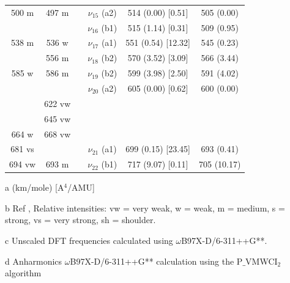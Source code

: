 \begin{table}[H]
\begin{center}
\begin{threeparttable}
\begin{tabular}{c c c c c c}
500 m & 497 m &  & $\nu_{15}$ (a2) & 514 (0.00) [0.51] & 505 (0.00) \\ 
&  &  & $\nu_{16}$ (b1) & 515 (1.14) [0.31] & 509 (0.95) \\ 
538 m & 536 w &  & $\nu_{17}$ (a1) & 551 (0.54) [12.32] & 545 (0.23) \\ 
& 556 m &  & $\nu_{18}$ (b2) & 570 (3.52) [3.09] & 566 (3.44) \\ 
585 w & 586 m &  & $\nu_{19}$ (b2) & 599 (3.98) [2.50] & 591 (4.02) \\ 
&  &  & $\nu_{20}$ (a2) & 605 (0.00) [0.62] & 600 (0.00) \\ 
& 622 vw &  &  &  & \multicolumn{1}{l}{} \\ 
& 645 vw &  &  &  &  \\ 
664 w & 668 vw &  &  & \multicolumn{1}{c}{} &  \\ 
681 vs &  &  & \multicolumn{1}{c}{$\nu_{21}$ (a1)} & 699 (0.15) [23.45] & 693 (0.41) \\ 
694 vw & 693 m &  & \multicolumn{1}{c}{$\nu_{22}$ (b1)} & \multicolumn{1}{c}{717 (9.07) [0.11]} & 705 (10.17) \\ 
\bottomrule
\end{tabular}

\begin{tablenotes}
	\item[a] (km/mole) [A$^{4}$/AMU]
	\item[b] Ref \cite{michaelian2014raman}, Relative intensities: vw = very weak, w = weak, m = medium, s = strong, vs = very strong, sh = shoulder.
	\item[c] Unscaled DFT frequencies calculated using $\omega$B97X-D/6-311++G**.
	\item[d] Anharmonics $\omega$B97X-D/6-311++G** calculation using the P$\_$VMWCI$_{2}$ algorithm
\end{tablenotes}
\end{threeparttable}
\end{center}
\label{lowfreq-18-dimethylfluorene}
\end{table}


   
   
